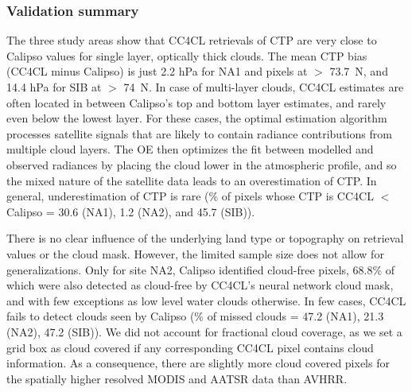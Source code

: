 \subsubsection{Validation summary}

The three study areas show that CC4CL retrievals of CTP are very close to Calipso values for single layer, optically thick clouds. The mean CTP bias (CC4CL minus Calipso) is just 2.2 hPa for NA1 and pixels at $>$ 73.7\textdegree\ N, and 14.4 hPa for SIB at $>$ 74\textdegree\ N. In case of multi-layer clouds, CC4CL estimates are often located in between Calipso's top and bottom layer estimates, and rarely even below the lowest layer. For these cases, the optimal estimation algorithm processes satellite signals that are likely to contain radiance contributions from multiple cloud layers. The OE then optimizes the fit between modelled and observed radiances by placing the cloud lower in the atmospheric profile, and so the mixed nature of the satellite data leads to an overestimation of CTP. In general, underestimation of CTP is rare (\% of pixels whose CTP is CC4CL $<$ Calipso = 30.6 (NA1), 1.2 (NA2), and 45.7 (SIB)).

There is no clear influence of the underlying land type or topography on retrieval values or the cloud mask. However, the limited sample size does not allow for generalizations. Only for site NA2, Calipso identified cloud-free pixels, 68.8\% of which were also detected as cloud-free by CC4CL's neural network cloud mask, and with few exceptions as low level water clouds otherwise. In few cases, CC4CL fails to detect clouds seen by Calipso (\% of missed clouds = 47.2 (NA1), 21.3 (NA2), 47.2 (SIB)). We did not account for fractional cloud coverage, as we set a grid box as cloud covered if any corresponding CC4CL pixel contains cloud information. As a consequence, there are slightly more cloud covered pixels for the spatially higher resolved MODIS and AATSR data than AVHRR.

